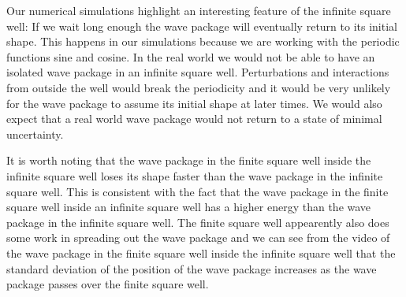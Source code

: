 \documentclass[12pt,a4paper]{article}
\begin{document}
Our numerical simulations highlight an interesting feature of the infinite square well: If we wait long enough the wave package will eventually return to its initial shape. This happens in our simulations because we are working with the periodic functions sine and cosine. In the real world we would not be able to have an isolated wave package in an infinite square well. Perturbations and interactions from outside the well would break the periodicity and it would be very unlikely for the wave package to assume its initial shape at later times. We would also expect that a real world wave package would not return to a state of minimal uncertainty.

It is worth noting that the wave package in the finite square well inside the infinite square well loses its shape faster than the wave package in the infinite square well. This is consistent with the fact that the wave package in the finite square well inside an infinite square well has a higher energy than the wave package in the infinite square well. The finite square well appearently also does some work in spreading out the wave package and we can see from the video of the wave package in the finite square well inside the infinite square well that the standard deviation of the position of the wave package increases as the wave package passes over the finite square well.
\end{document}
